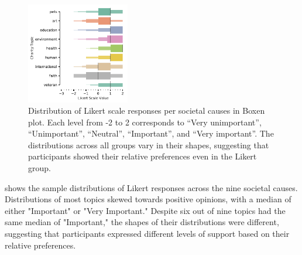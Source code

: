
\begin{figure}[htpb]
    \centering
    \includegraphics[width=0.4\textwidth, keepaspectratio=true]{content/image/likert_distribution_per_topic.pdf}
    \caption{
      Distribution of Likert scale responses per societal causes in Boxen plot. 
      Each level from -2 to 2 corresponds to 
      ``Very unimportant'', ``Unimportant'', ``Neutral'', ``Important'', and ``Very important''.
      The distributions across all groups vary in their shapes, suggesting that participants showed their relative preferences even in the Likert group.
    }
    \label{fig:likert_exp1}
\end{figure}


 shows the sample distributions of Likert responses across the nine societal causes. Distributions of most topics skewed towards positive opinions, with a median of either "Important" or "Very Important." Despite six out of nine topics had the same median of "Important," the shapes of their distributions were different, suggesting that participants expressed different levels of support based on their relative preferences. 

